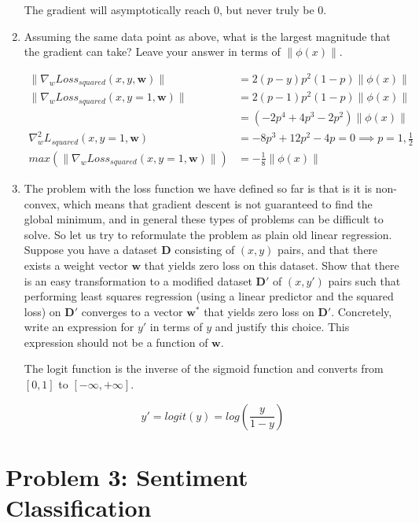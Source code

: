 \documentclass[10pt]{article}
\begin{document}
\begin{enumerate}[label=(\alph*)]
  The gradient will asymptotically reach 0, but never truly be 0.
  
  \item  Assuming the same data point as above, what is the largest magnitude that the gradient can take? Leave your answer in terms of $\lVert \phi(x) \rVert$.

  \begin{align*}
  \lVert \nabla_w Loss_{squared} (x, y, \mathbf{w}) \rVert &= 2(p - y) p^2 (1 - p) \lVert \phi(x) \rVert\\
  \lVert \nabla_w Loss_{squared} (x, y = 1, \mathbf{w}) \rVert &= 2(p - 1) p^2 (1 - p) \lVert \phi(x) \rVert\\
  &= (-2p^4 + 4p^3 -2p^2) \lVert \phi(x) \rVert\\
  \nabla_w^2 L_{squared} (x, y = 1, \mathbf{w}) &= -8p^3 + 12p^2 - 4p = 0 \implies p = 1, \frac{1}{2}\\
  max(\lVert \nabla_w Loss_{squared} (x, y = 1, \mathbf{w}) \rVert) &= -\frac{1}{8} \lVert \phi(x) \rVert
  \end{align*}
  
  \item The problem with the loss function we have defined so far is that is it is non-convex, which means that gradient descent is not guaranteed to find the global minimum, and in general these types of problems can be difficult to solve. So let us try to reformulate the problem as plain old linear regression. Suppose you have a dataset $\mathbf{D}$ consisting of $(x,y)$ pairs, and that there exists a weight vector $\mathbf{w}$ that yields zero loss on this dataset. Show that there is an easy transformation to a modified dataset $\mathbf{D'}$ of $(x,y')$ pairs such that performing least squares regression (using a linear predictor and the squared loss) on $\mathbf{D'}$ converges to a vector $\mathbf{w^*}$ that yields zero loss on $\mathbf{D'}$. Concretely, write an expression for $y'$ in terms of $y$ and justify this choice. This expression should not be a function of $\mathbf{w}$.
  
  The logit function is the inverse of the sigmoid function and converts from $[0,1]$ to $[-\infty,+\infty]$.
  
  $$y' = logit(y) = log(\frac{y}{1 - y})$$

\end{enumerate}

\section*{\normalsize Problem 3: Sentiment Classification}
\end{document}
